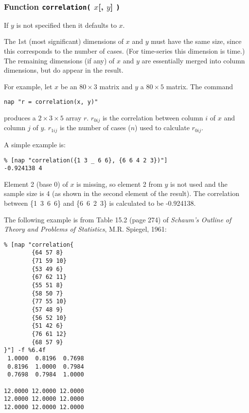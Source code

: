   \subsubsection{
    \label{function-correlation}Function \texttt{correlation(} $x$[, $y$] \texttt{)}
  }

  \par If 
  $y$ is not specified then it defaults to 
  $x$.
  \par The 1st (most significant) dimensions of 
  $x$ and 
  $y$ must have the same size, since this corresponds to the
  number of cases. (For time-series this dimension is time.) The
  remaining dimensions (if any) of 
  $x$ and 
  $y$ are essentially merged into column dimensions, but do
  appear in the result.
  \par For example, let 
  $x$ be an $80\times 3$ matrix and 
  $y$ a $80\times 5$ matrix. The command
  \begin{verbatim}
nap "r = correlation(x, y)"
\end{verbatim}

produces a $2\times 3\times 5$ array 
  $r$. 
  $r_{0ij}$
  is the correlation between column 
  $i$ of 
  $x$ and column 
  $j$ of 
  $y$. 
  $r_{1ij}$
  is the number of cases ($n$) used to calculate 
  $r_{0ij}$.
  \par A simple example is:
  \begin{verbatim}
% [nap "correlation({1 3 _ 6 6}, {6 6 4 2 3})"]
-0.924138 4
\end{verbatim}

Element 2 (base 0) of 
  $x$ is missing, so element 2 from 
  $y$ is not used and the sample size is 4 (as shown in the
  second element of the result). The correlation between
  \{1\ 3\ 6\ 6\} and \{6\ 6\ 2\ 3\} is calculated
  to be -0.924138.
  \par The following example is from Table 15.2 (page 274) of 
  \emph{Schaum's Outline of Theory and Problems of
  Statistics}, M.R. Spiegel, 1961:
  \begin{verbatim}
% [nap "correlation{
        {64 57 8}
        {71 59 10}
        {53 49 6}
        {67 62 11}
        {55 51 8}
        {58 50 7}
        {77 55 10}
        {57 48 9}
        {56 52 10}
        {51 42 6}
        {76 61 12}
        {68 57 9}
}"] -f %6.4f
 1.0000  0.8196  0.7698
 0.8196  1.0000  0.7984
 0.7698  0.7984  1.0000

12.0000 12.0000 12.0000
12.0000 12.0000 12.0000
12.0000 12.0000 12.0000
\end{verbatim}

